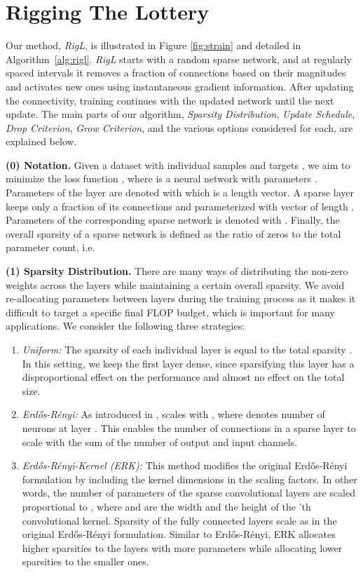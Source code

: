 \documentclass{article}
\begin{document}
\section{Rigging The Lottery}
\label{sec:rlottery}
Our method, \textit{RigL}, is illustrated in Figure \ref{fig:strain} and detailed in Algorithm~\ref{alg:rigl}. {\em RigL} starts with a random sparse network, and at regularly spaced intervals it removes a fraction of connections based on their magnitudes and activates new ones using instantaneous gradient information. After updating the connectivity, training continues with the updated network until the next update. The main parts of our algorithm, \textit{Sparsity Distribution}, \textit{Update Schedule}, \textit{Drop Criterion}, \textit{Grow Criterion}, and the various options considered for each, are explained below.


\textbf{(0) Notation.} Given a dataset  with individual samples  and targets , we aim to minimize the loss function , where  is a neural network with parameters . Parameters of the  layer are denoted with  which is a length  vector. A sparse layer keeps only a fraction  of its connections and  parameterized with vector  of length . Parameters of the corresponding sparse network is denoted with .  Finally, the overall sparsity of a sparse network is defined as the ratio of zeros to the total parameter count, i.e. 


\textbf{(1) Sparsity Distribution.} There are many ways of distributing the non-zero weights across the layers while maintaining a certain overall sparsity. We avoid re-allocating parameters between layers during the training process as it makes it difficult to target a specific final FLOP budget, which is important for many applications. We consider the following three strategies:

\begin{enumerate}
    \item \textit{Uniform:} The sparsity  of each individual layer is equal to the total sparsity . In this setting, we keep the first layer dense, since sparsifying this layer has a disproportional effect on the performance and almost no effect on the total size.
    \item \textit{Erdős-Rényi:} As introduced in \cite{Mocanu2018},  scales with , where  denotes number of neurons at layer . This enables the number of connections in a sparse layer to scale with the sum of the number of output and input channels.
    \item \textit{Erdős-Rényi-Kernel (ERK):} This method modifies the original Erdős-Rényi formulation by including the kernel dimensions in the scaling factors. In other words, the number of parameters of the sparse convolutional layers are scaled proportional to , where  and  are the width and the height of the 'th convolutional kernel. Sparsity of the fully connected layers scale as in the original Erdős-Rényi formulation. Similar to Erdős-Rényi, ERK allocates higher sparsities to the layers with more parameters while allocating lower sparsities to the smaller ones.
\end{enumerate}
\end{document}

